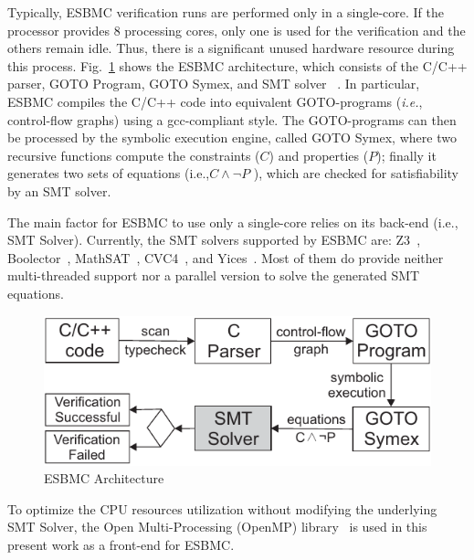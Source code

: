 Typically, ESBMC verification runs are performed only in a single-core. If the processor provides $8$ processing cores, only one is used for the verification and the others remain idle. Thus, there is a significant unused hardware resource during this process. 
Fig.~\ref{ESBMC-Architecture} shows the ESBMC architecture, which consists of the C/C++ parser, GOTO Program, GOTO Symex, and SMT solver ~\cite{Ramalho2013}. In particular, ESBMC compiles the C/C++ code into equivalent GOTO\hyp{}programs ({\it i.e.}, control-flow graphs) using a gcc-compliant style. The GOTO-programs can then be processed by the symbolic execution engine, called GOTO Symex, where two recursive functions compute the constraints ($C$) and properties ($P$); finally it generates two sets of equations (i.e.,\:$C \land \neg P$ ), which are checked for satisfiability by an SMT solver. 

The main factor for ESBMC to use only a single-core relies on its back-end (i.e., SMT Solver). Currently, the SMT solvers supported by ESBMC are: Z3~\cite{DeMoura2008}, Boolector~\cite{Brummayer2009}, MathSAT~\cite{Barrett2011}, CVC4~\cite{Bozzano2005}, and Yices~\cite{Dutertre2014}. Most of them do provide neither multi-threaded support nor a parallel version to solve the generated SMT equations.
\begin{figure}[ht]
	\centering
  \includegraphics[scale=0.9]{Image/esbmc-arch-new.pdf} 
	\caption{ESBMC Architecture}
	\label{ESBMC-Architecture}
\end{figure}

To optimize the CPU resources utilization without modifying the underlying SMT Solver, the Open Multi-Processing (OpenMP) library~\cite{Dagum1998} is used in this present work as a front-end for ESBMC.

